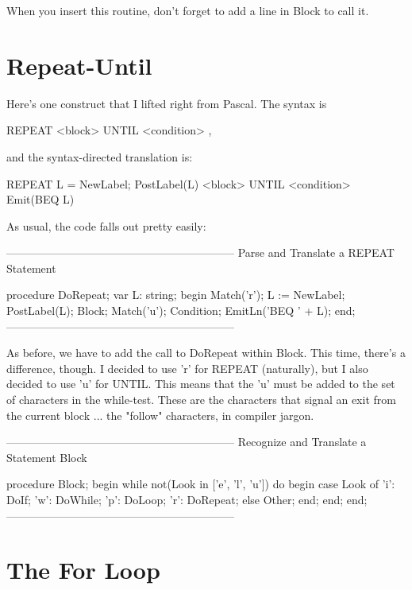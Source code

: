\documentclass[float=false, crop=false]{standalone}
\begin{document}
When you insert this routine, don't forget to add a line in Block to call it.


\section{Repeat-Until}

Here's one construct that I lifted right from Pascal. The syntax is


     REPEAT <block> UNTIL <condition>  ,


and the syntax-directed translation is:


     REPEAT         { L = NewLabel;
                      PostLabel(L) }
     <block>
     UNTIL
     <condition>    { Emit(BEQ L) }


As usual, the code falls out pretty easily:

\begin{code}
{--------------------------------------------------------------}
{ Parse and Translate a REPEAT Statement }

procedure DoRepeat;
var L: string;
begin
   Match('r');
   L := NewLabel;
   PostLabel(L);
   Block;
   Match('u');
   Condition;
   EmitLn('BEQ ' + L);
end;
{--------------------------------------------------------------}
\end{code}

As before, we have to add the call to DoRepeat within Block. This time, there's
a difference, though. I decided to use 'r' for REPEAT (naturally), but I also
decided to use 'u' for UNTIL. This means that the 'u' must be added to the set
of characters in the while-test. These are the characters that signal an exit
from the current block ... the "follow" characters, in compiler jargon.

\begin{code}
{--------------------------------------------------------------}
{ Recognize and Translate a Statement Block }

procedure Block;
begin
   while not(Look in ['e', 'l', 'u']) do begin
      case Look of
       'i': DoIf;
       'w': DoWhile;
       'p': DoLoop;
       'r': DoRepeat;
       else Other;
      end;
   end;
end;
{--------------------------------------------------------------}
\end{code}

\section{The For Loop}
\end{document}
